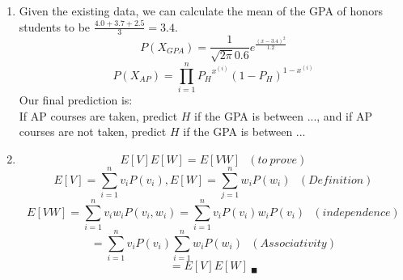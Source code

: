 \documentclass{article}
\begin{document}
\begin{enumerate}
        \item
            Given the existing data, we can calculate the mean of the GPA of
            honors students to be $ \frac{4.0 + 3.7 + 2.5}{3} = 3.4 $.
            $$ P( X_{GPA} ) = \frac{1}{\sqrt{2 \pi} 0.6} e^{\frac{(x - 3.4)^2 }{1.2} }$$
            $$ P( X_{AP} ) = \prod\limits_{i = 1}^{n} {P_H}^{x^{(i)}}(1 - P_H)^{1 - x^{(i)}} $$
            Our final prediction is: \\
            If AP courses are taken, predict $H$ if the GPA is between ..., and
            if AP courses are not taken, predict $H$ if the GPA is between ... \\
        \item
            $$ E[V]E[W] = E[VW] \ \ \ (to\ prove)$$
            $$ E[V] = \sum_{i = 1}^{n} v_i P(v_i), E[W] = \sum_{j = 1}^{n} w_i P(w_i) \ \ \ (Definition)$$
            $$ E[VW] = \sum_{i = 1}^{n} v_iw_iP(v_i, w_i) = \sum_{i = 1}^{n} v_iP(v_i)w_iP(v_i) \ \ \ (independence)$$
            $$ = \sum_{i = 1}^{n} v_i P(v_i) \sum_{i = 1}^{n} w_i P(w_i) \ \ \ (Associativity)$$
            $$ = E[V]E[W]\ _\blacksquare$$
\end{enumerate}
\end{document}
